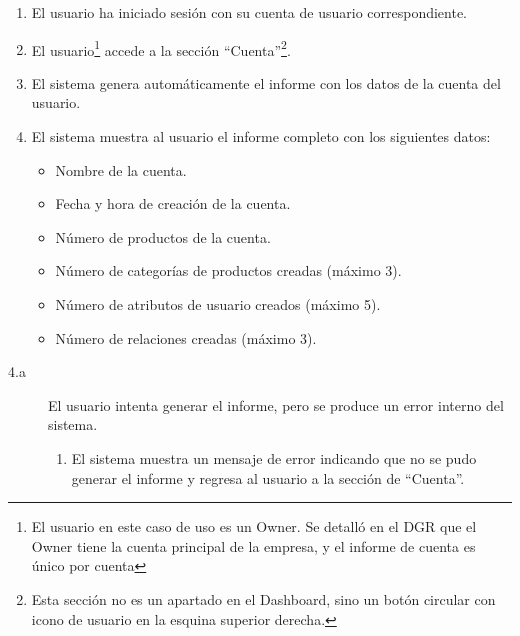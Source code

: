 \begin{enumerate}
    \item El usuario ha iniciado sesión con su cuenta de usuario correspondiente.
    \item El usuario\footnote{El usuario en este caso de uso es un Owner. Se detalló en el DGR que el Owner tiene la cuenta principal de la empresa, y el informe de cuenta es único por cuenta} accede a la sección \enquote{Cuenta}\footnote{Esta sección no es un apartado en el Dashboard, sino un botón circular con icono de usuario en la esquina superior derecha.}.
    \item El sistema genera automáticamente el informe con los datos de la cuenta del usuario.
    \item El sistema muestra al usuario el informe completo con los siguientes datos:
        \begin{itemize}
            \item Nombre de la cuenta.
            \item Fecha y hora de creación de la cuenta.
            \item Número de productos de la cuenta.
            \item Número de categorías de productos creadas (máximo 3).
            \item Número de atributos de usuario creados (máximo 5).
            \item Número de relaciones creadas (máximo 3).
        \end{itemize}
\end{enumerate}

\newpage %

\begin{description}        
    \item[4.a] El usuario intenta generar el informe, pero se produce un error interno del sistema.
    \begin{enumerate}
        \item[4.a.1] El sistema muestra un mensaje de error indicando que no se pudo generar el informe y regresa al usuario a la sección de \enquote{Cuenta}.
    \end{enumerate}
\end{description}

